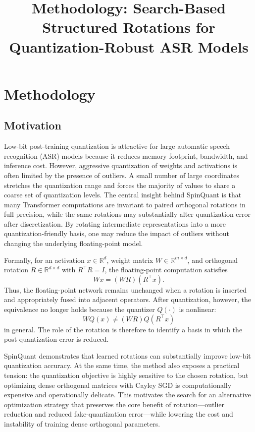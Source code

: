 \documentclass[11pt]{article}
\title{Methodology: Search-Based Structured Rotations for Quantization-Robust ASR Models}
\author{}
\date{}
\newcommand{\R}{\mathbb{R}}
\begin{document}
\maketitle

\section{Methodology}

\subsection{Motivation}
Low-bit post-training quantization is attractive for large automatic speech recognition (ASR) models because it reduces memory footprint, bandwidth, and inference cost. However, aggressive quantization of weights and activations is often limited by the presence of outliers. A small number of large coordinates stretches the quantization range and forces the majority of values to share a coarse set of quantization levels. The central insight behind SpinQuant is that many Transformer computations are invariant to paired orthogonal rotations in full precision, while the same rotations may substantially alter quantization error after discretization. By rotating intermediate representations into a more quantization-friendly basis, one may reduce the impact of outliers without changing the underlying floating-point model.

Formally, for an activation $x \in \R^d$, weight matrix $W \in \R^{m \times d}$, and orthogonal rotation $R \in \R^{d \times d}$ with $R^\top R = I$, the floating-point computation satisfies
\begin{equation}
Wx = (WR)(R^\top x).
\end{equation}
Thus, the floating-point network remains unchanged when a rotation is inserted and appropriately fused into adjacent operators. After quantization, however, the equivalence no longer holds because the quantizer $Q(\cdot)$ is nonlinear:
\begin{equation}
WQ(x) \neq (WR)Q(R^\top x)
\end{equation}
in general. The role of the rotation is therefore to identify a basis in which the post-quantization error is reduced.

SpinQuant demonstrates that learned rotations can substantially improve low-bit quantization accuracy. At the same time, the method also exposes a practical tension: the quantization objective is highly sensitive to the chosen rotation, but optimizing dense orthogonal matrices with Cayley SGD is computationally expensive and operationally delicate. This motivates the search for an alternative optimization strategy that preserves the core benefit of rotation---outlier reduction and reduced fake-quantization error---while lowering the cost and instability of training dense orthogonal parameters.
\end{document}
